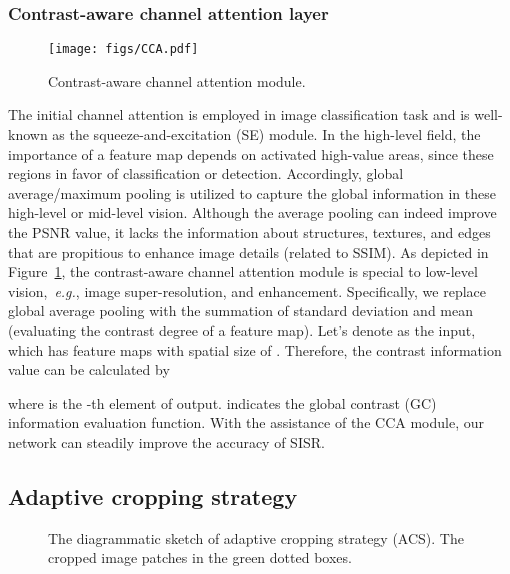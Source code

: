 \documentclass[sigconf]{acmart}
\newcommand{\eg}{\emph{e.g.}}
\begin{document}
\subsubsection{Contrast-aware channel attention layer}
\begin{figure}[htpb]
	\centering
	\texttt{[image: figs/CCA.pdf]}
	\vspace{-3mm}
	\caption{Contrast-aware channel attention module.}
	\label{fig:cca}
\end{figure}
The initial channel attention is employed in image classification task and is well-known as the squeeze-and-excitation (SE) module. In the high-level field, the importance of a feature map depends on activated high-value areas, since these regions in favor of classification or detection. Accordingly, global average/maximum pooling is utilized to capture the global information in these high-level or mid-level vision. Although the average pooling can indeed improve the PSNR value, it lacks the information about structures, textures, and edges that are propitious to enhance image details (related to SSIM). As depicted in Figure~\ref{fig:cca}, the contrast-aware channel attention module is special to low-level vision,~\eg, image super-resolution, and enhancement. Specifically, we replace global average pooling with the summation of standard deviation and mean (evaluating the contrast degree of a feature map). Let's denote  as the input, which has  feature maps with spatial size of . Therefore, the contrast information value can be calculated by

where  is the -th element of output.  indicates the global contrast (GC) information evaluation function. With the assistance of the CCA module, our network can steadily improve the accuracy of SISR.

\subsection{Adaptive cropping strategy}

\begin{figure}[ht]
	\centering
	\hfil
	\vspace{-3mm}
	\caption{The diagrammatic sketch of adaptive cropping strategy (ACS). The cropped image patches in the green dotted boxes.}
	\label{fig:acs}
\end{figure}
\end{document}
